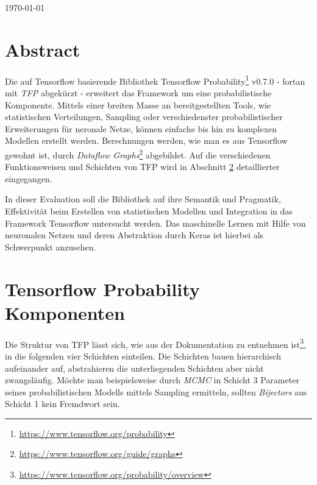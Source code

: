 \documentclass[12pt]{article}
\begin{document}
\begin{titlepage}
\begin{center}

\vspace{\fill} %

{\large \today}\\[3cm] %

\end{center}

\end{titlepage}



\tableofcontents

\newpage


\section{Abstract}
\label{abstract}
Die auf Tensorflow basierende Bibliothek Tensorflow Probability\footnote{\url{https://www.tensorflow.org/probability}} v0.7.0 - fortan mit \textit{TFP} abgekürzt - erweitert das Framework um eine probabilistische Komponente.
Mittels einer breiten Masse an bereitgestellten Tools, wie statistischen Verteilungen, Sampling oder verschiedenster probabilistischer Erweiterungen für neronale Netze, können einfache bis hin zu komplexen Modellen erstellt werden. Berechnungen werden, wie man es aus Tensorflow gewohnt ist, durch \textit{Dataflow Graphs}\footnote{\url{https://www.tensorflow.org/guide/graphs}} abgebildet. Auf die verschiedenen Funktionsweisen und Schichten von TFP wird in Abschnitt \ref{sec:tfp-components} detaillierter eingegangen.

In dieser Evaluation soll die Bibliothek auf ihre Semantik und Pragmatik, Effektivität beim Erstellen von statistischen Modellen und Integration in das Framework Tensorflow untersucht werden. Das maschinelle Lernen mit Hilfe von neuronalen Netzen und deren Abstraktion durch Keras ist hierbei als Schwerpunkt anzusehen.

\section{Tensorflow Probability Komponenten}
\label{sec:tfp-components}
Die Struktur von TFP lässt sich, wie aus der Dokumentation zu entnehmen ist\footnote{\url{https://www.tensorflow.org/probability/overview}}, in die folgenden vier Schichten einteilen. Die Schichten bauen hierarchisch aufeinander auf, abstrahieren die unterliegenden Schichten aber nicht zwangsläufig. Möchte man beispielsweise durch \textit{MCMC} in Schicht 3 Parameter seines probabilistischen Modells mittels Sampling ermitteln, sollten \textit{Bijectors} aus Schicht 1 kein Fremdwort sein.
\end{document}
